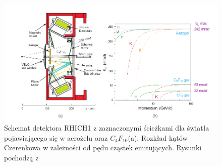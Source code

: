 \begin{figure}[th]
  \centering
  \includegraphics[scale=0.5]{rozdzial2/RICH.png}
  \caption{Schemat detektora RHICH1	z zaznaczonymi ścieżkami dla światła pojawiającego się w aerożelu oraz $C_4F_{10}$(a). Rozkład kątów Czerenkowa w zależności od pędu cząstek emitujących. Rysunki pochodzą z  \cite{public}}
  \label{fig:RICH}
\end{figure}


